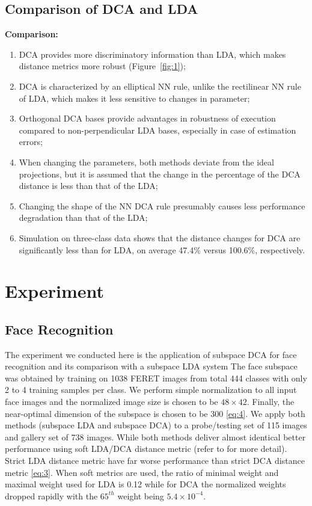 \documentclass[12pt]{article}
\begin{document}
\subsection{Comparison of DCA and LDA}

\textbf{Comparison:}
\begin{enumerate}
    \item DCA provides more discriminatory information than LDA, which makes distance metrics more robust (Figure~\ref{fig:1});
    \item DCA is characterized by an elliptical NN rule, unlike the rectilinear NN rule of LDA, which makes it less sensitive to changes in parameter;
    \item Orthogonal DCA bases provide advantages in robustness of execution compared to non-perpendicular LDA bases, especially in case of estimation errors;
    \item When changing the parameters, both methods deviate from the ideal projections, but it is assumed that the change in the percentage of the DCA distance is less than that of the LDA;
    \item Changing the shape of the NN DCA rule presumably causes less performance degradation than that of the LDA;
    \item Simulation on three-class data shows that the distance changes for DCA are significantly less than for LDA, on average 47.4\% versus 100.6\%, respectively.
\end{enumerate}

\newpage

\section{Experiment}

\subsection{Face Recognition}
\hspace{10pt}
The experiment we conducted here is the application of subspace DCA for face recognition and its comparison with a subspace LDA system The face subspace was obtained by training on 1038 FERET images from total 444 classes with only 2 to 4 training samples per class. We perform simple normalization to all input face images and the normalized image size is chosen to be \(48 \times 42\). Finally, the near-optimal dimension of the subspace is chosen to be 300 \eqref{eq:4}. We apply both methods (subspace LDA and subspace DCA) to a probe/testing set of 115 images and gallery set of 738 images. While both methods deliver almost identical better performance using soft LDA/DCA distance metric (refer to for more detail). Strict LDA distance metric have far worse performance than strict DCA distance metric \eqref{eq:3}. When soft metrics are used, the ratio of minimal weight and maximal weight used for LDA is 0.12 while for DCA the normalized weights dropped rapidly with the $65^{th}$ weight being \(5.4 \times 10^{-4}\).
\end{document}
